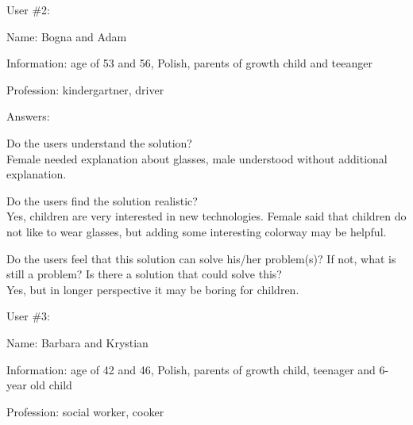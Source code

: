 \documentclass[a4paper,10pt,oneside]{scrreprt}
\begin{document}
User \#2:
\begin{compactitem}
	\item Name: Bogna and Adam
	\item Information: age of 53 and 56, Polish, parents of growth child and teeanger
	\item Profession: kindergartner, driver
\end{compactitem}
\bigskip

Answers:
\begin{compactitem}
	\item Do the users understand the solution?\\
	Female needed explanation about glasses, male understood without additional explanation.\\
	
	\item Do the users find the solution realistic?\\
	Yes, children are very interested in new technologies. Female said that children do not like to wear glasses, but adding some interesting colorway may be helpful.\\
	
	\item Do the users feel that this solution can solve his/her problem(s)? If not, what is still
	a problem? Is there a solution that could solve this?\\
	Yes, but in longer perspective it may be boring for children.\\
\end{compactitem}
\bigskip

User \#3:
\begin{compactitem}
	\item Name: Barbara and Krystian
	\item Information: age of 42 and 46, Polish, parents of growth child, teenager and 6-year old child
	\item Profession: social worker, cooker
\end{compactitem}
\bigskip
\end{document}

